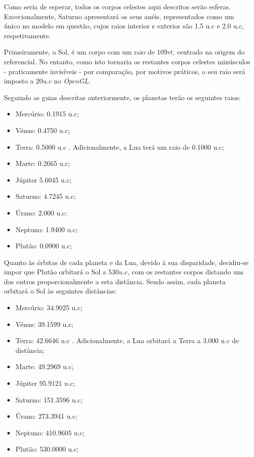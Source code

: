 \documentclass[a4paper]{article}
\begin{document}
\par Como seria de esperar, todos os corpos celestes aqui descritos serão esferas. Excecionalmente, Saturno apresentará os seus anéis\cite{sat_rings}, representados como um único no modelo em questão, cujos raios interior e exterior são 1.5 u.c e 2.0 u.c, respetivamente.

\par Primeiramente, o Sol, é um corpo com um raio de $109 rt$, centrado na origem do referencial. No entanto, como isto tornaria os restantes corpos celestes minúsculos - praticamente invisíveis - por comparação, por motivos práticos, o seu raio será imposto a $20 u.c$ no \textit{OpenGL}.

\par Seguindo as guias descritas anteriormente, os planetas terão os seguintes raios:
\begin{itemize}
    \item Mercúrio: 0.1915 u.c;
    \item Vénus: 0.4750 u.c;
    \item Terra: 0.5000 u.c . Adicionalmente, a Lua terá um raio de 0.1000 u.c;
    \item Marte: 0.2665 u.c;
    \item Júpiter 5.6045 u.c;
    \item Saturno: 4.7245 u.c;
    \item Úrano: 2.000 u.c;
    \item Neptuno: 1.9400 u.c;
    \item Plutão: 0.0900 u.c;
\end{itemize}

\par Quanto às órbitas de cada planeta e da Lua, devido à sua disparidade, decidiu-se impor que Plutão orbitará o Sol a $530 u.c$, com os restantes corpos distando uns dos outros proporcionalmente a esta distância. Sendo assim, cada planeta orbitará o Sol às seguintes distâncias:
\begin{itemize}
    \item Mercúrio: 34.9025 u.c;
    \item Vénus: 39.1599 u.c;
    \item Terra: 42.6646 u.c . Adicionalmente, a Lua orbitará a Terra a 3.000 u.c de distância;
    \item Marte: 49.2969 u.c;
    \item Júpiter 95.9121 u.c;
    \item Saturno: 151.3596 u.c;
    \item Úrano: 273.3941 u.c;
    \item Neptuno: 410.9605 u.c;
    \item Plutão: 530.0000 u.c;
\end{itemize}
\end{document}
